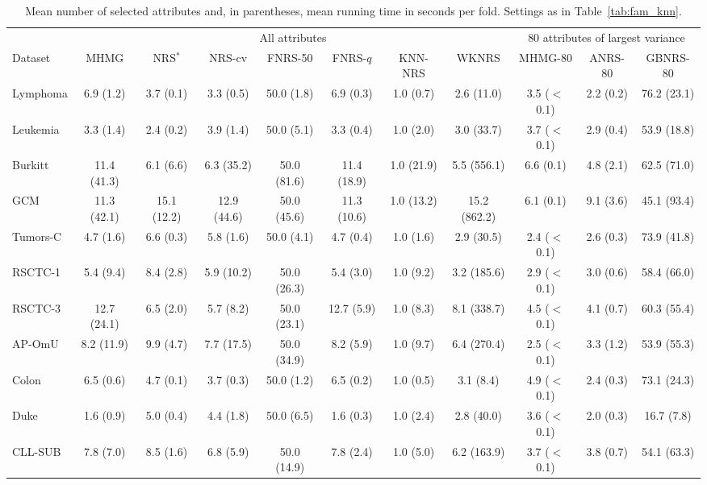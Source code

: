 \begin{table}[!t]
\centering
\caption{Mean number of selected attributes and, in parentheses, mean running time in seconds per fold. Settings as in Table~\ref{tab:fam_knn}.}
\label{tab:fam_size}
\scriptsize
\setlength{\tabcolsep}{1.6pt}
\begin{tabular*}{\textwidth}{@{\extracolsep{\fill}}lcccccccccc@{}}
\toprule
 & \multicolumn{7}{c}{All attributes} & \multicolumn{3}{c}{80 attributes of largest variance} \\
\cmidrule(lr){2-8}\cmidrule(l){9-11}
Dataset & MHMG & NRS$^*$ & NRS-cv & FNRS-50 & FNRS-$q$ & KNN-NRS & WKNRS & MHMG-80 & ANRS-80 & GBNRS-80 \\
\midrule
Lymphoma & 6.9 (1.2) & 3.7 (0.1) & 3.3 (0.5) & 50.0 (1.8) & 6.9 (0.3) & 1.0 (0.7) & 2.6 (11.0) & 3.5 ($<$0.1) & 2.2 (0.2) & 76.2 (23.1) \\
Leukemia & 3.3 (1.4) & 2.4 (0.2) & 3.9 (1.4) & 50.0 (5.1) & 3.3 (0.4) & 1.0 (2.0) & 3.0 (33.7) & 3.7 ($<$0.1) & 2.9 (0.4) & 53.9 (18.8) \\
Burkitt & 11.4 (41.3) & 6.1 (6.6) & 6.3 (35.2) & 50.0 (81.6) & 11.4 (18.9) & 1.0 (21.9) & 5.5 (556.1) & 6.6 (0.1) & 4.8 (2.1) & 62.5 (71.0) \\
GCM & 11.3 (42.1) & 15.1 (12.2) & 12.9 (44.6) & 50.0 (45.6) & 11.3 (10.6) & 1.0 (13.2) & 15.2 (862.2) & 6.1 (0.1) & 9.1 (3.6) & 45.1 (93.4) \\
Tumors-C & 4.7 (1.6) & 6.6 (0.3) & 5.8 (1.6) & 50.0 (4.1) & 4.7 (0.4) & 1.0 (1.6) & 2.9 (30.5) & 2.4 ($<$0.1) & 2.6 (0.3) & 73.9 (41.8) \\
RSCTC-1 & 5.4 (9.4) & 8.4 (2.8) & 5.9 (10.2) & 50.0 (26.3) & 5.4 (3.0) & 1.0 (9.2) & 3.2 (185.6) & 2.9 ($<$0.1) & 3.0 (0.6) & 58.4 (66.0) \\
RSCTC-3 & 12.7 (24.1) & 6.5 (2.0) & 5.7 (8.2) & 50.0 (23.1) & 12.7 (5.9) & 1.0 (8.3) & 8.1 (338.7) & 4.5 ($<$0.1) & 4.1 (0.7) & 60.3 (55.4) \\
AP-OmU & 8.2 (11.9) & 9.9 (4.7) & 7.7 (17.5) & 50.0 (34.9) & 8.2 (5.9) & 1.0 (9.7) & 6.4 (270.4) & 2.5 ($<$0.1) & 3.3 (1.2) & 53.9 (55.3) \\
Colon & 6.5 (0.6) & 4.7 (0.1) & 3.7 (0.3) & 50.0 (1.2) & 6.5 (0.2) & 1.0 (0.5) & 3.1 (8.4) & 4.9 ($<$0.1) & 2.4 (0.3) & 73.1 (24.3) \\
Duke & 1.6 (0.9) & 5.0 (0.4) & 4.4 (1.8) & 50.0 (6.5) & 1.6 (0.3) & 1.0 (2.4) & 2.8 (40.0) & 3.6 ($<$0.1) & 2.0 (0.3) & 16.7 (7.8) \\
CLL-SUB & 7.8 (7.0) & 8.5 (1.6) & 6.8 (5.9) & 50.0 (14.9) & 7.8 (2.4) & 1.0 (5.0) & 6.2 (163.9) & 3.7 ($<$0.1) & 3.8 (0.7) & 54.1 (63.3) \\

\end{tabular*}
\end{table}
